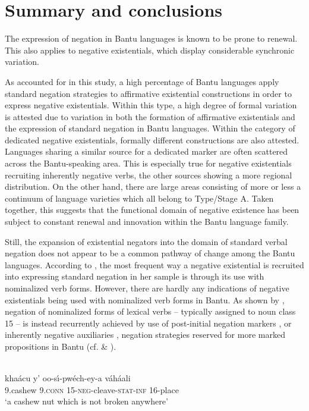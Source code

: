 \documentclass[output=paper,draft,draftmode,colorlinks,citecolor=brown]{langscibook}
\begin{document}
\section{Summary and conclusions}\label{sec:1:7}
%
The expression of negation in Bantu languages is known to be prone to renewal. This also applies to negative existentials, which display considerable synchronic variation.

As accounted for in this study, a high percentage of Bantu
languages apply standard negation strategies to affirmative
existential constructions in order to express negative existentials. Within
this type, a high degree of formal variation is attested due to variation
in both the formation of affirmative existentials and the expression of
standard negation in Bantu languages. Within the category of dedicated
negative existentials, formally different constructions are also attested.
Languages sharing a similar source for a dedicated marker are often
scattered across the Bantu-speaking area. This is especially true for negative existentials recruiting inherently negative verbs, the other sources showing a more regional distribution. On the other hand, there are
large areas consisting of more or less a continuum of language varieties
which all belong to Type\slash Stage A. Taken together, this suggests that the functional domain of negative existence has been subject to constant renewal and innovation within the Bantu language family.

Still, the expansion of existential negators into the domain of standard
verbal negation does not appear to be a common pathway of change among the
Bantu languages. According to \citet{Veselinova2016}, the most frequent way
a negative existential is recruited into expressing standard negation in
her sample is through its use with nominalized verb forms. However, there
are hardly any indications of negative existentials being used with
nominalized verb forms in Bantu. As shown by
\citet{Guldemann1996,Guldemann1999}, negation of nominalized forms of
lexical verbs -- typically assigned to noun class 15 -- is instead recurrently achieved by use of post-initial negation markers , or inherently negative auxiliaries , negation strategies reserved for more marked propositions in Bantu (cf.  \& ).
%

\ea\label{ex:shangaji-cashew}
\\
\gll khaácu y' oo-s\'\i-pw{é}ch-ey-a váháali\\
9.cashew 9.\textsc{conn} 15-\textsc{neg}-cleave-\textsc{stat-inf} 16-place\\
\glt `a cashew nut which is not broken anywhere'
\z
%
\end{document}
